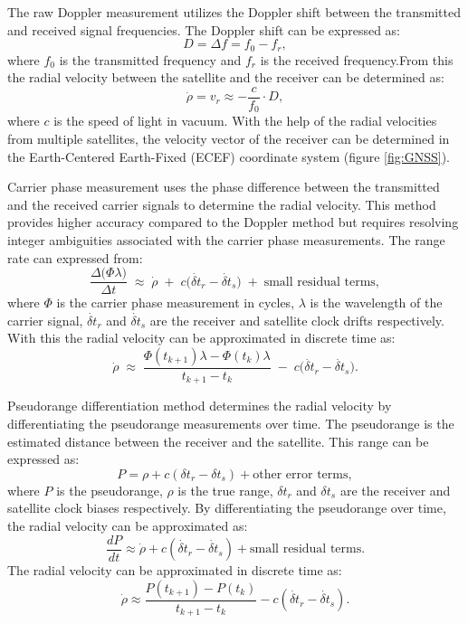 The raw Doppler measurement utilizes the Doppler shift between the transmitted and received signal frequencies. The Doppler shift can be expressed as:
\begin{equation}
    D = \Delta f = f_{0} - f_{r},
\end{equation}
where $f_{0}$ is the transmitted frequency and $f_{r}$ is the received frequency.From this the radial velocity between the satellite and the receiver can be determined as:
\begin{equation}
    \dot\rho = v_r \approx -\frac{c}{f_{0}} \cdot D,
\end{equation}
where $c$ is the speed of light in vacuum. With the help of the radial velocities from multiple satellites, the velocity vector of the receiver can be determined in the Earth-Centered Earth-Fixed (ECEF) coordinate system (figure \ref{fig:GNSS}).

Carrier phase measurement uses the phase difference between the transmitted and the received carrier signals to determine the radial velocity. This method provides higher accuracy compared to the Doppler method but requires resolving integer ambiguities associated with the carrier phase measurements. The range rate can expressed from:
\begin{equation}
  \frac{\Delta\bigl(\Phi \lambda\bigr)}{\Delta t}
  \;\approx\;
  \dot{\rho}
  \;+\; c \bigl( \dot{\delta t}_r - \dot{\delta t}_s \bigr)
  \;+\; \text{small residual terms},
\end{equation}
where $\Phi$ is the carrier phase measurement in cycles, $\lambda$ is the wavelength of the carrier signal, $\dot{\delta t}_r$ and $\dot{\delta t}_s$ are the receiver and satellite clock drifts respectively. With this the radial velocity can be approximated in discrete time as:
\begin{equation}
  \dot{\rho} \;\approx\;
  \frac{ \Phi(t_{k+1})\lambda - \Phi(t_k)\lambda }{ t_{k+1} - t_k }  \;-\; c \bigl( \dot{\delta t}_r - \dot{\delta t}_s \bigr).
\end{equation}

Pseudorange differentiation method determines the radial velocity by differentiating the pseudorange measurements over time. The pseudorange is the estimated distance between the receiver and the satellite. This range can be expressed as:
\begin{equation}
    P = \rho + c(\delta t_r - \delta t_s) + \text{other error terms},
\end{equation}
where $P$ is the pseudorange, $\rho$ is the true range, $\delta t_r$ and $\delta t_s$ are the receiver and satellite clock biases respectively. By differentiating the pseudorange over time, the radial velocity can be approximated as:
\begin{equation}
    \frac{dP}{dt} \approx \dot{\rho} + c(\dot{\delta t}_r - \dot{\delta t}_s) + \text{small residual terms}.
\end{equation}
The radial velocity can be approximated in discrete time as:
\begin{equation}
    \dot{\rho} \approx \frac{P(t_{k+1}) - P(t_k)}{t_{k+1} - t_k} - c(\dot{\delta t}_r - \dot{\delta t}_s).
\end{equation}

